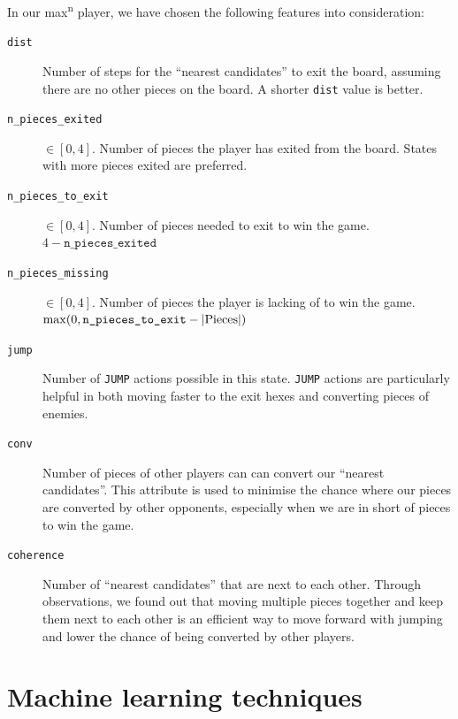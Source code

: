 \documentclass[12pt,a4paper]{article}
\newcommand{\maxn}{max\textsuperscript{n}}
\begin{document}
In our \maxn{} player, we have chosen the following features into 
consideration:

\begin{description}
    \item[\texttt{dist}] Number of steps for the 
        ``nearest candidates''\footnotemark{} to exit the board, assuming there 
        are no other pieces on the board. A shorter \texttt{dist} value 
        is better.
    \item[\texttt{n\_pieces\_exited}]  $\in [0, 4]$. Number of pieces the 
        player has exited from the board. States with more pieces 
        exited are preferred.
    \item[\texttt{n\_pieces\_to\_exit}] $\in [0, 4]$. Number of pieces needed 
        to exit to win the game. $4 - \texttt{n\_pieces\_exited}$
    \item[\texttt{n\_pieces\_missing}] $\in [0, 4]$. Number of pieces the player
        is lacking of to win the game. \\
        $\max(0, \texttt{n\textunderscore pieces\textunderscore to\textunderscore exit} - |\text{Pieces}|)$
    \item[\texttt{jump}] Number of \texttt{JUMP} actions possible in 
        this state. \texttt{JUMP} actions are particularly helpful in both
        moving faster to the exit hexes and converting pieces of enemies.  
    \item[\texttt{conv}] Number of pieces of other players can can convert
        our ``nearest candidates''. This attribute is used to minimise the
        chance where our pieces are converted by other opponents, especially
        when we are in short of pieces to win the game.
    \item[\texttt{coherence}] Number of ``nearest candidates'' that are next 
        to each other. Through observations, we found out that moving multiple
        pieces together and keep them next to each other is an efficient way
        to move forward with jumping and lower the chance of being converted
        by other players.
\end{description}


\section{Machine learning techniques}
\end{document}

